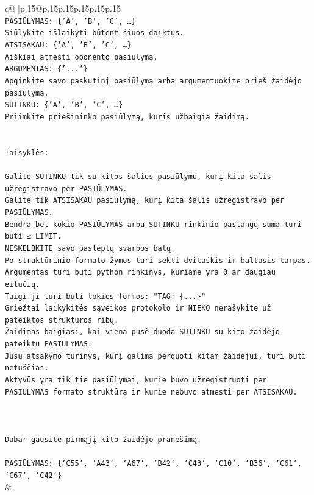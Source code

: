 \documentclass{article}
\begin{document}
{\begin{supertabular}{c@{$\;$}|p{.15\linewidth}@{}p{.15\linewidth}p{.15\linewidth}p{.15\linewidth}p{.15\linewidth}p{.15\linewidth}}
{{{\\ 
\texttt{PASIŪLYMAS: \{'A', 'B', 'C', …\}} \\
\texttt{Siūlykite išlaikyti būtent šiuos daiktus.} \\
\texttt{ATSISAKAU: \{'A', 'B', 'C', …\}} \\
\texttt{Aiškiai atmesti oponento pasiūlymą.} \\
\texttt{ARGUMENTAS: \{'...'\}} \\
\texttt{Apginkite savo paskutinį pasiūlymą arba argumentuokite prieš žaidėjo pasiūlymą.} \\
\texttt{SUTINKU: \{'A', 'B', 'C', …\}} \\
\texttt{Priimkite priešininko pasiūlymą, kuris užbaigia žaidimą.} \\
\\ 
\\ 
\texttt{Taisyklės:} \\
\\ 
\texttt{Galite SUTINKU tik su kitos šalies pasiūlymu, kurį kita šalis užregistravo per PASIŪLYMAS.} \\
\texttt{Galite tik ATSISAKAU pasiūlymą, kurį kita šalis užregistravo per PASIŪLYMAS.} \\
\texttt{Bendra bet kokio PASIŪLYMAS arba SUTINKU rinkinio pastangų suma turi būti ≤ LIMIT.} \\
\texttt{NESKELBKITE savo paslėptų svarbos balų.} \\
\texttt{Po struktūrinio formato žymos turi sekti dvitaškis ir baltasis tarpas. Argumentas turi būti python rinkinys, kuriame yra 0 ar daugiau eilučių.} \\
\texttt{Taigi ji turi būti tokios formos: "TAG: \{...\}"} \\
\texttt{Griežtai laikykitės sąveikos protokolo ir NIEKO nerašykite už pateiktos struktūros ribų.} \\
\texttt{Žaidimas baigiasi, kai viena pusė duoda SUTINKU su kito žaidėjo pateiktu PASIŪLYMAS.} \\
\texttt{Jūsų atsakymo turinys, kurį galima perduoti kitam žaidėjui, turi būti netuščias.} \\
\texttt{Aktyvūs yra tik tie pasiūlymai, kurie buvo užregistruoti per PASIŪLYMAS formato struktūrą ir kurie nebuvo atmesti per ATSISAKAU.} \\
\\ 
\\ 
\\ 
\texttt{Dabar gausite pirmąjį kito žaidėjo pranešimą.} \\
\\ 
\texttt{PASIŪLYMAS: \{'C55', 'A43', 'A67', 'B42', 'C43', 'C10', 'B36', 'C61', 'C67', 'C42'\}} \\
            }
        }
    }
    & \\ \\


\end{supertabular}}
\end{document}
